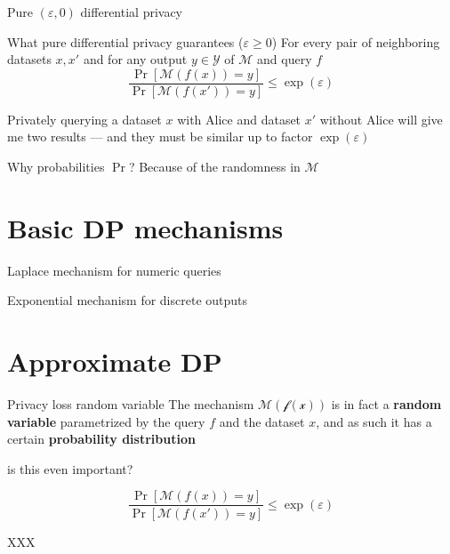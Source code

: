 \documentclass[12pt,aspectratio=169,handout]{beamer}
\begin{document}
\begin{frame}{Pure $(\varepsilon, 0)$ differential privacy}
	
\begin{block}{What pure differential privacy guarantees ($\varepsilon \geq 0$)}
	For every pair of neighboring datasets $x, x'$ and for any output $y \in \mathcal{Y}$ of $\mathcal{M}$ and query $f$
	$$
	\frac{
		\Pr \left[ \mathcal{M}(f(x)) = y  \right]
	}{
		\Pr \left[ \mathcal{M}(f(x')) = y  \right]
	}
	\leq \exp(\varepsilon)
	$$
\end{block}

Privately querying a dataset $x$ with Alice and dataset $x'$ without Alice will give me two results --- and they must be similar up to factor $\exp(\varepsilon)$

Why probabilities $\Pr$? Because of the randomness in $\mathcal{M}$	
\end{frame}

\section{Basic DP mechanisms}

\begin{frame}{Laplace mechanism for numeric queries}
	
\end{frame}


\begin{frame}{Exponential mechanism for discrete outputs}
	
\end{frame}

\section{Approximate DP}

\begin{frame}{Privacy loss random variable}
The mechanism $\mathcal{M(f(x))}$ is in fact a \textbf{random variable} parametrized by the query $f$ and the dataset $x$, and as such it has a certain \textbf{probability distribution}

is this even important?

$$
\frac{
	\Pr \left[ \mathcal{M}(f(x)) = y  \right]
}{
	\Pr \left[ \mathcal{M}(f(x')) = y  \right]
}
\leq \exp(\varepsilon)
$$


\end{frame}


\begin{frame}{XXX}
	
\end{frame}
\end{document}
